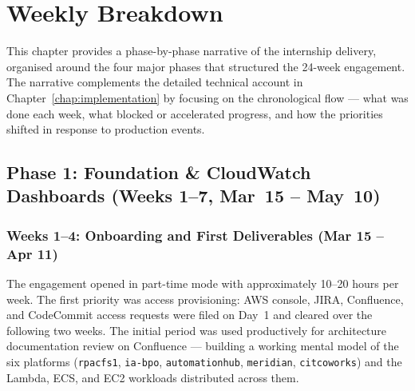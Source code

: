 
\chapter{Weekly Breakdown}
\label{chap:weekly_breakdown}

This chapter provides a phase-by-phase narrative of the internship delivery,
organised around the four major phases that structured the 24-week engagement.
The narrative complements the detailed technical account in
Chapter~\ref{chap:implementation} by focusing on the chronological flow ---
what was done each week, what blocked or accelerated progress, and how the
priorities shifted in response to production events.

\section{Phase 1: Foundation \& CloudWatch Dashboards (Weeks 1--7, Mar~15 -- May~10)}
\label{sec:wb_phase1}

\subsection{Weeks 1--4: Onboarding and First Deliverables (Mar 15 -- Apr 11)}

The engagement opened in part-time mode with approximately 10--20 hours per
week. The first priority was access provisioning: AWS console, JIRA,
Confluence, and CodeCommit access requests were filed on Day~1 and cleared
over the following two weeks. The initial period was used productively for
architecture documentation review on Confluence --- building a working mental
model of the six platforms (\texttt{rpacfs1}, \texttt{ia-bpo},
\texttt{automationhub}, \texttt{meridian}, \texttt{citcoworks}) and the
Lambda, ECS, and EC2 workloads distributed across them.

